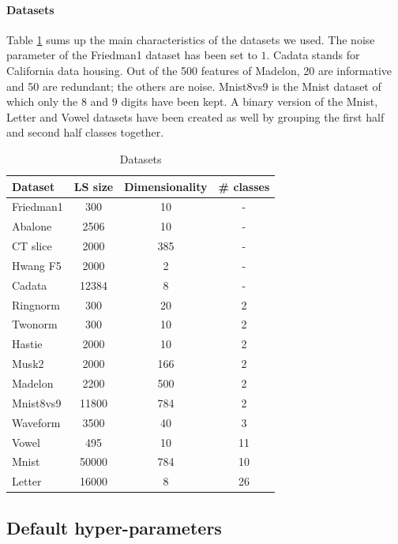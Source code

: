 \documentclass{article}
\begin{document}
\paragraph{Datasets}
Table \ref{tab:datasets} sums up the main characteristics of the datasets we 
used. The noise parameter of the Friedman1 dataset has been set to $1$. Cadata 
stands for California data housing. Out of the 500 features of Madelon, 20 are 
informative and 50 are redundant; the others are noise. Mnist8vs9 is the Mnist 
dataset of which only the $8$ and $9$ digits have been kept. A binary version 
of the Mnist, Letter and Vowel datasets have been created as well by grouping 
the first half and second half classes together.

\begin{table}[t]
\caption{Datasets}
\label{tab:datasets}
\vskip 0.15in
\begin{center}
\begin{small}
\begin{sc}
\begin{tabular}{l|ccc}
\hline
Dataset & LS size & Dimensionality & \# classes\\
\hline
Friedman1 & 300 & 10 & - \\
Abalone & 2506 & 10 & - \\
CT slice & 2000 & 385 & - \\
Hwang F5 & 2000 & 2 & - \\
Cadata & 12384 & 8 & - \\
Ringnorm & 300 & 20 & 2 \\
Twonorm & 300 & 10 & 2 \\
Hastie & 2000 & 10 & 2 \\
Musk2 & 2000 & 166 & 2 \\
Madelon & 2200 & 500 & 2 \\
Mnist8vs9 & 11800 & 784 & 2 \\
Waveform & 3500 & 40 & 3 \\
Vowel & 495 & 10 & 11 \\
Mnist & 50000 & 784 & 10 \\
Letter & 16000 & 8 & 26 \\
\hline
\end{tabular}
\end{sc}
\end{small}
\end{center}
\vskip -0.1in
\end{table}

\subsection{Default hyper-parameters}
\label{subsec:defaultHP}
\end{document}

